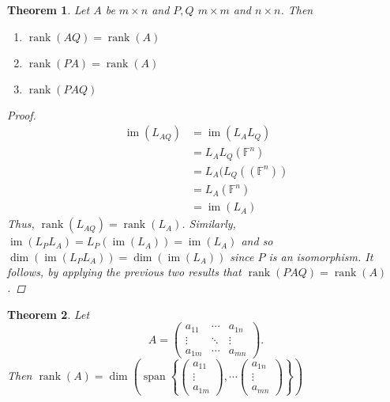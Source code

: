 \documentclass[oneside, 12pt]{book}
\DeclareMathOperator{\rank}{rank}
\DeclareMathOperator{\spn}{span}
\DeclareMathOperator{\im}{im}
\newtheorem{thm}{Theorem}[section]
\theoremstyle{definition}
\begin{document}
\begin{thm}
  \label{thm_rnkprp}
  Let $A$ be $m \times n$ and $P, Q$ $m \times m$ and $n \times n$.
  Then
  \begin{enumerate}
    \item $\rank(AQ)=\rank(A)$
    \item $\rank(PA)=\rank(A)$
    \item $\rank(PAQ)$
  \end{enumerate}
  \begin{proof}
    \begin{align}
      \im(L_{AQ})&=\im(L_{A}L_{Q}) \\
                 &= L_{A}L_{Q}(\mathbb{F}^{n}) \\
                 &= L_{A}(L_{Q}((\mathbb{F}^{n})) \\
                 &= L_{A}(\mathbb{F}^{n}) \\
                 &=\im(L_{A})
    \end{align}
    Thus, $\rank(L_{AQ})=\rank(L_{A})$.
    Similarly, $\im(L_{P}L_{A})=L_{P}(\im(L_{A}))=\im(L_{A})$
    and so $\dim(\im(L_{P}L_{A}))=\dim(\im(L_{A}))$ since $P$ is an isomorphism.
    It follows, by applying the previous two results that
    $\rank(PAQ)=\rank(A)$.
  \end{proof}
\end{thm}
\begin{thm}
\label{thm_colm}
Let \[A=\begin{pmatrix}
          a_{11} & \cdots & a_{1n} \\
          \vdots & \ddots & \vdots \\
          a_{1m} & \cdots & a_{mn}

        \end{pmatrix}.\] Then $\rank(A)=\dim \left(
        \spn{ \left \{
          \begin{pmatrix} a_{11} \\ \vdots \\ a_{1m}\end{pmatrix}, \cdots \begin{pmatrix} a_{1n}\\ \vdots \\ a_{mn} \end{pmatrix}
        \right \}
        }\right )
        $
\end{thm}
\end{document}
